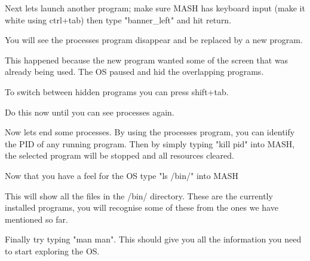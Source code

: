 \documentclass[a4paper]{report}
\begin{document}
Next lets launch another program; make sure MASH has keyboard input (make it white using ctrl+tab) then type "banner\_left" and hit return.

You will see the processes program disappear and be replaced by a new program.

This happened because the new program wanted some of the screen that was already being used. The OS paused and hid the overlapping programs.

To switch between hidden programs you can press shift+tab.

Do this now until you can see processes again.

Now lets end some processes. By using the processes program, you can identify the PID of any running program. Then by simply typing "kill pid" into MASH, the selected program will be stopped and all resources cleared.

Now that you have a feel for the OS type "ls /bin/" into MASH

This will show all the files in the /bin/ directory. These are the currently installed programs, you will recognise some of these from the ones we have mentioned so far.

Finally try typing "man man". This should give you all the information you need to start exploring the OS.
\end{document}
